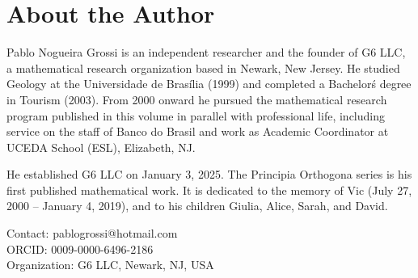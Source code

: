 \chapter*{About the Author}

Pablo Nogueira Grossi is an independent researcher and the founder of G6 LLC,
a mathematical research organization based in Newark, New Jersey. He studied
Geology at the Universidade de Bras\'ilia (1999) and completed a Bachelor\'s
degree in Tourism (2003). From 2000 onward he pursued the mathematical research
program published in this volume in parallel with professional life, including
service on the staff of Banco do Brasil and work as Academic Coordinator at
UCEDA School (ESL), Elizabeth, NJ.

He established G6 LLC on January 3, 2025. The Principia Orthogona series is
his first published mathematical work. It is dedicated to the memory of
Vic (July 27, 2000 -- January 4, 2019), and to his children Giulia,
Alice, Sarah, and David.

\bigskip
\noindent Contact: pablogrossi@hotmail.com\\
ORCID: 0009-0000-6496-2186\\
Organization: G6 LLC, Newark, NJ, USA

\newpage
\thispagestyle{empty}
\mbox{}




